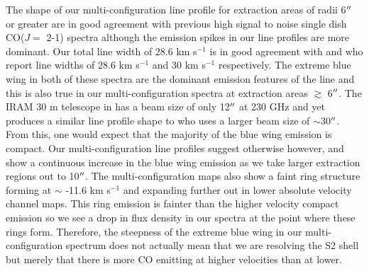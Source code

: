 \documentclass[iop]{emulateapj}
\begin{document}
The shape of our multi-configuration line profile for extraction areas of radii 6$\mbox{$^{\prime\prime}$}$ or greater are in good agreement with previous high signal to noise single dish CO($J=$ 2-1) spectra \cite[e.g.][Fig. 1.]{1994ApJ...424L.127H} although the emission spikes in our line profiles are more dominant. Our total line width of 28.6 km s${}^{-1}$ is in good agreement with \cite{1987ApJ...313..400H} and \cite{1994ApJ...424L.127H} who report line widths of 28.6 km s${}^{-1}$ and 30 km s${}^{-1}$ respectively. The extreme blue wing in both of these spectra are the dominant emission features of the line and this is also true in our multi-configuration spectra at extraction areas $\gtrsim$ 6$\mbox{$^{\prime\prime}$}$. The IRAM 30 m telescope in \cite{1994ApJ...424L.127H} has a beam size of only 12$\mbox{$^{\prime\prime}$}$ at 230 GHz and yet produces a similar line profile shape to \cite{1987ApJ...313..400H} who uses a larger beam size of $\sim$30$\mbox{$^{\prime\prime}$}$. From this, one would expect that the majority of the blue wing emission is compact. Our multi-configuration line profiles suggest otherwise however, and show a continuous increase in the blue wing emission as we take larger extraction regions out to 10$\mbox{$^{\prime\prime}$}$. The multi-configuration maps also show a faint ring structure forming at $\sim$ -11.6 km s${}^{-1}$ and expanding further out in lower absolute velocity channel maps. This ring emission is fainter than the higher velocity compact emission so we see a drop in flux density in our spectra at the point where these rings form. Therefore, the steepness of the extreme blue wing in our multi-configuration spectrum does not actually mean that we are resolving the S2 shell but merely that there is more CO emitting at higher velocities than at lower.
\end{document}

